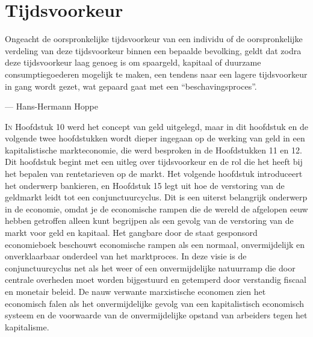 \hypertarget{tijdsvoorkeur}{%
\chapter{Tijdsvoorkeur}\label{tijdsvoorkeur}}

\begin{blockquotebox}
    Ongeacht de oorspronkelijke tijdsvoorkeur van een individu of de oorspronkelijke verdeling van deze tijdsvoorkeur binnen een bepaalde bevolking, geldt dat zodra deze tijdsvoorkeur laag genoeg is om spaargeld, kapitaal of duurzame consumptiegoederen mogelijk te maken, een tendens naar een lagere tijdsvoorkeur in gang wordt gezet, wat gepaard gaat met een ``beschavingsproces''.\footnotemark
    \par\raggedleft--- Hans-Hermann Hoppe
\end{blockquotebox}
\autocite{146}

\lettrine{I}n Hoofdstuk 10 werd het concept van geld uitgelegd, maar in dit hoofdstuk en de volgende twee hoofdstukken wordt dieper ingegaan op de werking van geld in een kapitalistische markteconomie, die werd besproken in de Hoofdstukken 11 en 12. Dit hoofdstuk begint met een uitleg over tijdsvoorkeur en de rol die het heeft bij het bepalen van rentetarieven op de markt. Het volgende hoofdstuk introduceert het onderwerp bankieren, en Hoofdstuk 15 legt uit hoe de verstoring van de geldmarkt leidt tot een conjunctuurcyclus. Dit is een uiterst belangrijk onderwerp in de economie, omdat je de economische rampen die de wereld de afgelopen eeuw hebben getroffen alleen kunt begrijpen als een gevolg van de verstoring van de markt voor geld en kapitaal. Het gangbare door de staat gesponsord economieboek beschouwt economische rampen als een normaal, onvermijdelijk en onverklaarbaar onderdeel van het marktproces. In deze visie is de conjunctuurcyclus net als het weer of een onvermijdelijke natuurramp die door centrale overheden moet worden bijgestuurd en getemperd door verstandig fiscaal en monetair beleid. De nauw verwante marxistische economen zien het economisch falen als het onvermijdelijke gevolg van een kapitalistisch economisch systeem en de voorwaarde van de onvermijdelijke opstand van arbeiders tegen het kapitalisme.

